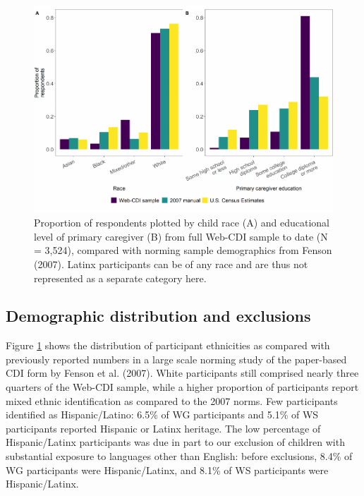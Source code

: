 \documentclass[
  english,
  ,man,floatsintext]{apa6}
\begin{document}
\begin{figure}
\centering
\includegraphics{webcdi_paper_files/figure-latex/demobarfig-1.pdf}
\caption{\label{fig:demobarfig}Proportion of respondents plotted by child race (A) and educational level of primary caregiver (B) from full Web-CDI sample to date (N = 3,524), compared with norming sample demographics from Fenson (2007). Latinx participants can be of any race and are thus not represented as a separate category here.}
\end{figure}

\hypertarget{demographic-distribution-and-exclusions}{%
\subsection{Demographic distribution and exclusions}\label{demographic-distribution-and-exclusions}}

Figure \ref{fig:demobarfig} shows the distribution of participant ethnicities as compared with previously reported numbers in a large scale norming study of the paper-based CDI form by Fenson et al. (2007). White participants still comprised nearly three quarters of the Web-CDI sample, while a higher proportion of participants report mixed ethnic identification as compared to the 2007 norms. Few participants identified as Hispanic/Latino: 6.5\% of WG participants and 5.1\% of WS participants reported Hispanic or Latinx heritage. The low percentage of Hispanic/Latinx participants was due in part to our exclusion of children with substantial exposure to languages other than English: before exclusions, 8.4\% of WG participants were Hispanic/Latinx, and 8.1\% of WS participants were Hispanic/Latinx.
\end{document}
